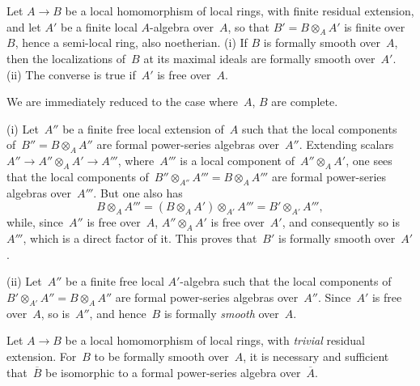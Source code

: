 \begin{proposition}
\label{III.1.4}
Let $A\to B$ be a local homomorphism of local rings, with finite residual extension, and let $A'$ be a finite local $A$-algebra over~$A$, so that $B'=B\otimes_A A'$ is finite over~$B$, hence a semi-local ring, also noetherian. \textup{(i)} If $B$ is formally smooth over~$A$, then the localizations of~$B$ at its maximal ideals are formally smooth over~$A'$. \textup{(ii)} The converse is true if~$A'$ is free over~$A$.
\end{proposition}

We are immediately reduced to the case where~$A$, $B$ are complete.

(i) Let~$A''$ be a finite free local extension of~$A$ such that the local components of~$B''=B\otimes_A A''$ are formal power-series algebras over~$A''$. Extending scalars $A''\to A''\otimes_A A'\to A'''$, where~$A'''$ is a local component of~$A''\otimes_A A'$, one sees that the local components of~$B''\otimes_{A''} A'''=B\otimes_A A'''$ are formal power-series algebras over~$A'''$. But one also has
\[
B\otimes_A A'''=(B\otimes_A A')\otimes_{A'} A'''=B'\otimes_{A'} A''',
\]
while, since~$A''$ is free over~$A$, $A''\otimes_A A'$ is free over~$A'$, and consequently so is~$A'''$, which is a direct factor of it. This proves that~$B'$ is formally smooth over~$A'$.

(ii) Let~$A''$ be a finite free local $A'$-algebra such that the local components of~$B'\otimes_{A'} A''=B\otimes_A A''$ are formal power-series algebras over~$A''$. Since~$A'$ is free over~$A$, so is~$A''$, and hence~$B$ is formally \emph{smooth} over~$A$.

\begin{proposition}
\label{III.1.5}
Let $A\to B$ be a local homomorphism of local rings, with \emph{trivial} residual extension. For~$B$ to be formally smooth over~$A$, it is necessary and sufficient that~$\overline{B}$ be isomorphic to a formal power-series algebra over~$\overline{A}$.
\end{proposition}

